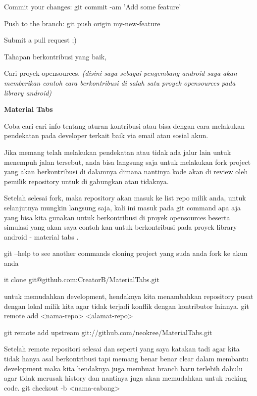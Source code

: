 Commit your changes: git commit -am 'Add some feature' \par
Push to the branch: git push origin my-new-feature \par
Submit a pull request ;) \par
\noindent 
Tahapan berkontribusi yang baik, \par
\noindent 
Cari proyek opensources. \textit{(disini saya sebagai pengembang android saya akan memberikan contoh cara berkontribusi di salah satu proyek opensources pada library android)} \par
\noindent 
\textbf{Material Tabs} \par
\noindent 
Coba cari cari info tentang aturan kontribusi atau bisa dengan cara melakukan pendekatan pada developer terkait baik via email atau sosial akun. \par
\noindent 
Jika memang telah melakukan pendekatan atau tidak ada jalur lain untuk menempuh jalan tersebut, anda bisa langsung saja untuk melakukan fork project yang akan berkontribusi di dalamnya dimana nantinya kode akan di review oleh pemilik repository untuk di gabungkan atau tidaknya. \par
\noindent 
Setelah selesai fork, maka repository akan masuk ke list repo milik anda, untuk selanjutnya mungkin langsung saja, kali ini masuk pada git command apa aja yang bisa kita gunakan untuk berkontribusi di proyek opensources beserta simulasi yang akan saya contoh kan untuk berkontribusi pada proyek library android - material tabs . \par
\vspace{12pt}
\noindent 
git --help to see another commands cloning project yang suda anda fork ke akun anda \par
\vspace{12pt}
\noindent 
it clone git@github.com:CreatorB/MaterialTabs.git \par
\noindent 
untuk memudahkan development, hendaknya kita menambahkan repository pusat dengan lokal milik kita agar tidak terjadi konflik dengan kontributor lainnya. git remote add <nama-repo> <alamat-repo> \par
\noindent 
git remote add upstream git://github.com/neokree/MaterialTabs.git \par
\noindent 
Setelah remote repositori selesai dan seperti yang saya katakan tadi agar kita tidak hanya asal berkontribusi tapi memang benar benar clear dalam membantu development maka kita hendaknya juga membuat branch baru terlebih dahulu agar tidak merusak history dan nantinya juga akan memudahkan untuk racking code. git checkout -b <nama-cabang> \par
